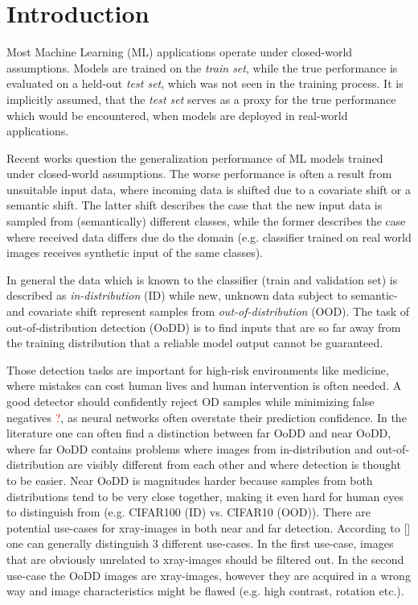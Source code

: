 \section{Introduction}
\raggedbottom
Most Machine Learning (ML) applications operate under closed-world assumptions.
Models are trained on the \textit{train set}, while the true performance is evaluated on a held-out \textit{test set}, which was not seen in the training process.
It is implicitly assumed, that the \textit{test set} serves as a proxy for the true performance which would be encountered, when models are deployed in real-world applications.
\par
Recent works question the generalization performance of ML models trained under closed-world assumptions.
The worse performance is often a result from unsuitable input data, where incoming data is shifted due to a covariate shift or a semantic shift.
The latter shift describes the case that the new input data is sampled from (semantically) different classes, while the former describes the case where received data differs due do the domain (e.g. classifier trained on real world images receives synthetic input of the same classes).
\par
In general the data which is known to the classifier (train and validation set) is described as \textit{in-distribution} (ID) while new, unknown data subject to semantic- and covariate shift represent samples from \textit{out-of-distribution} (OOD).
The task of out-of-distribution detection (OoDD) is to find inputs that are so far away from the training distribution that a reliable model output cannot be guaranteed.
\par
Those detection tasks are important for high-risk environments like medicine, where mistakes can cost human lives and human intervention is often needed.
A good detector should confidently reject OD samples while minimizing false negatives \textcolor{red}{?}, as neural networks often overstate their prediction confidence.
In the literature one can often find a distinction between far OoDD and near OoDD, where far OoDD contains problems where images from in-distribution and out-of-distribution are visibly different from each other and where detection is thought to be easier.
Near OoDD is magnitudes harder because samples from both distributions tend to be very close together, making it even hard for human eyes to distinguish from (e.g. CIFAR100 (ID) vs. CIFAR10 (OOD)).
There are potential use-cases for xray-images in both near and far detection.
According to [] one can generally distinguish 3 different use-cases.
In the first use-case, images that are obviously unrelated to xray-images should be filtered out.
In the second use-case the OoDD images are xray-images, however they are acquired in a wrong way and image characteristics might be flawed (e.g. high contrast, rotation etc.).


